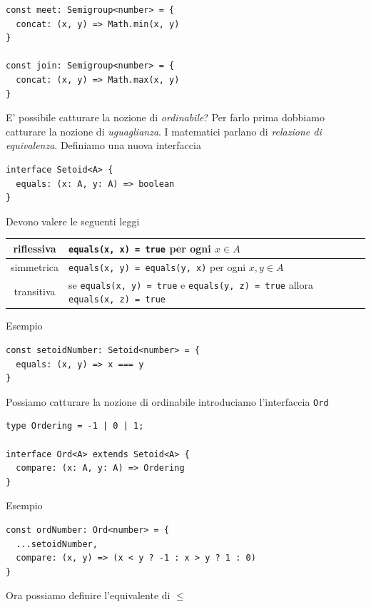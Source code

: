\documentclass[12pt]{article}
\begin{document}
\begin{verbatim}
const meet: Semigroup<number> = {
  concat: (x, y) => Math.min(x, y)
}

const join: Semigroup<number> = {
  concat: (x, y) => Math.max(x, y)
}
\end{verbatim}

E' possibile catturare la nozione di \emph{ordinabile}? Per farlo prima dobbiamo catturare la nozione di \emph{uguaglianza}.
I matematici parlano di \emph{relazione di equivalenza}.
Definiamo una nuova interfaccia

\begin{verbatim}
interface Setoid<A> {
  equals: (x: A, y: A) => boolean
}
\end{verbatim}

Devono valere le seguenti leggi

\begin{center}
\bgroup
\def\arraystretch{1.5}
\begin{tabular}{ |c|p{10cm}| }
\hline
riflessiva & \texttt{equals(x, x) = true} per ogni $x \in A$ \\
\hline
simmetrica & \texttt{equals(x, y) = equals(y, x)} per ogni $x, y \in A$ \\
\hline
transitiva & se \texttt{equals(x, y) = true} e \texttt{equals(y, z) = true} allora \texttt{equals(x, z) = true} \\
\hline
\end{tabular}
\egroup
\end{center}

Esempio

\begin{verbatim}
const setoidNumber: Setoid<number> = {
  equals: (x, y) => x === y
}
\end{verbatim}

Possiamo catturare la nozione di ordinabile introduciamo l'interfaccia \texttt{Ord}

\begin{verbatim}
type Ordering = -1 | 0 | 1;

interface Ord<A> extends Setoid<A> {
  compare: (x: A, y: A) => Ordering
}
\end{verbatim}

Esempio

\begin{verbatim}
const ordNumber: Ord<number> = {
  ...setoidNumber,
  compare: (x, y) => (x < y ? -1 : x > y ? 1 : 0)
}
\end{verbatim}


Ora possiamo definire l'equivalente di $\leq$
\end{document}
